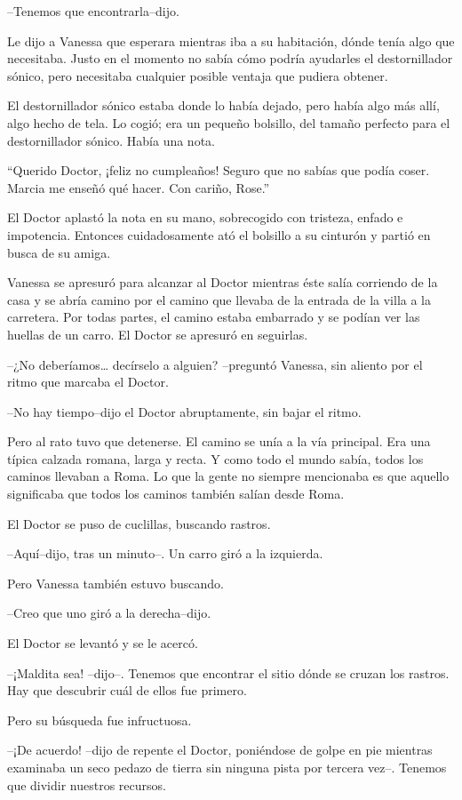 --Tenemos que encontrarla--dijo.

Le dijo a Vanessa que esperara mientras iba a su habitación, dónde tenía
algo que necesitaba. Justo en el momento no sabía cómo podría ayudarles
el destornillador sónico, pero necesitaba cualquier posible ventaja que
pudiera obtener.

El destornillador sónico estaba donde lo había dejado, pero había algo
más allí, algo hecho de tela. Lo cogió; era un pequeño bolsillo, del
tamaño perfecto para el destornillador sónico. Había una nota.

``Querido Doctor, ¡feliz no cumpleaños! Seguro que no sabías que podía
coser. Marcia me enseñó qué hacer. Con cariño, Rose.''

El Doctor aplastó la nota en su mano, sobrecogido con tristeza, enfado e
impotencia. Entonces cuidadosamente ató el bolsillo a su cinturón y
partió en busca de su amiga.

Vanessa se apresuró para alcanzar al Doctor mientras éste salía
corriendo de la casa y se abría camino por el camino que llevaba de la
entrada de la villa a la carretera. Por todas partes, el camino estaba
embarrado y se podían ver las huellas de un carro. El Doctor se apresuró
en seguirlas.

--¿No deberíamos\ldots{} decírselo a alguien? --preguntó Vanessa, sin
aliento por el ritmo que marcaba el Doctor.

--No hay tiempo--dijo el Doctor abruptamente, sin bajar el ritmo.

Pero al rato tuvo que detenerse. El camino se unía a la vía principal.
Era una típica calzada romana, larga y recta. Y como todo el mundo
sabía, todos los caminos llevaban a Roma. Lo que la gente no siempre
mencionaba es que aquello significaba que todos los caminos también
salían desde Roma.

El Doctor se puso de cuclillas, buscando rastros.

--Aquí--dijo, tras un minuto--. Un carro giró a la izquierda.

Pero Vanessa también estuvo buscando.

--Creo que uno giró a la derecha--dijo.

El Doctor se levantó y se le acercó.

--¡Maldita sea! --dijo--. Tenemos que encontrar el sitio dónde se cruzan
los rastros. Hay que descubrir cuál de ellos fue primero.

Pero su búsqueda fue infructuosa.

--¡De acuerdo! --dijo de repente el Doctor, poniéndose de golpe en pie
mientras examinaba un seco pedazo de tierra sin ninguna pista por
tercera vez--. Tenemos que dividir nuestros recursos.

